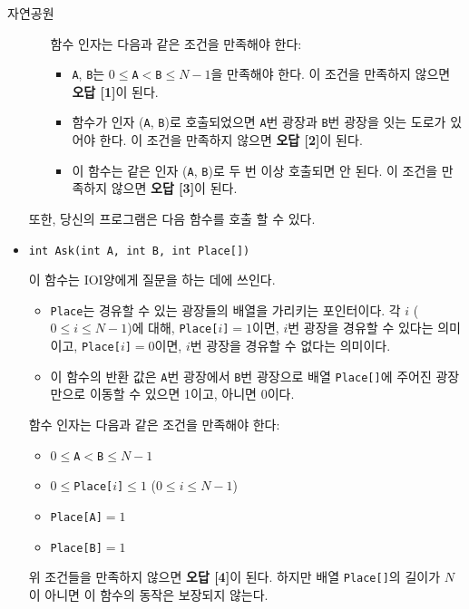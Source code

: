 \begin{problem}{자연공원}
\begin{itemize}
\begin{itemize}
			함수 인자는 다음과 같은 조건을 만족해야 한다:
		
			\begin{itemize}
				\item \texttt{A}, \texttt{B}는 $0 \le $\texttt{A}$ < $\texttt{B}$ \le N-1$을 만족해야 한다. 이 조건을 만족하지 않으면 \textbf{오답 [1]}이 된다.
				\item 함수가 인자 (\texttt{A}, \texttt{B})로 호출되었으면 \texttt{A}번 광장과 \texttt{B}번 광장을 잇는 도로가 있어야 한다. 이 조건을 만족하지 않으면 \textbf{오답 [2]}이 된다.
				\item 이 함수는 같은 인자 (\texttt{A}, \texttt{B})로 두 번 이상 호출되면 안 된다. 이 조건을 만족하지 않으면 \textbf{오답 [3]}이 된다.
			\end{itemize}
		\end{itemize}
	
		또한, 당신의 프로그램은 다음 함수를 호출 할 수 있다.
		
		\item \texttt{int Ask(int A, int B, int Place[])}
		
		이 함수는 IOI양에게 질문을 하는 데에 쓰인다.
		\begin{itemize}
			\item \texttt{Place}는 경유할 수 있는 광장들의 배열을 가리키는 포인터이다. 각 $i$ ($0 \le i \le N-1$)에 대해, \texttt{Place[}$i$\texttt{]}$=1$이면, $i$번 광장을 경유할 수 있다는 의미이고, \texttt{Place[}$i$\texttt{]}$=0$이면, $i$번 광장을 경유할 수 없다는 의미이다.
			\item 이 함수의 반환 값은 \texttt{A}번 광장에서 \texttt{B}번 광장으로 배열 \texttt{Place[]}에 주어진 광장만으로 이동할 수 있으면 1이고, 아니면 0이다.
		\end{itemize}
	
	
		함수 인자는 다음과 같은 조건을 만족해야 한다:
		
		\begin{itemize}
			\item $0 \le $\texttt{A}$ < $\texttt{B}$ \le N-1$
			\item $0 \le$\texttt{Place[}$i$\texttt{]}$\le 1$  ($0 \le i \le N-1$)
			\item \texttt{Place[A]}$=1$
			\item \texttt{Place[B]}$=1$
		\end{itemize}
	
		위 조건들을 만족하지 않으면 \textbf{오답 [4]}이 된다. 하지만 배열 \texttt{Place[]}의 길이가 $N$이 아니면 이 함수의 동작은 보장되지 않는다.
		

\end{itemize}
\end{problem}
